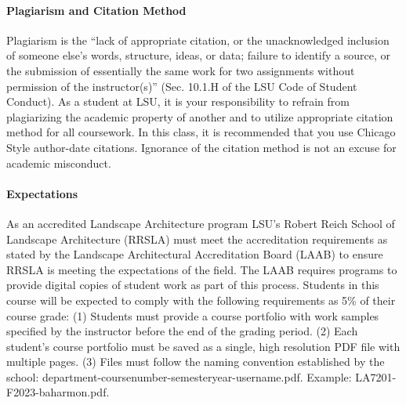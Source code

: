 \documentclass[11pt,article,oneside]{memoir}
\begin{document}
\paragraph{Plagiarism and Citation Method}
Plagiarism is the ``lack of appropriate citation, or the unacknowledged inclusion of someone else's words, structure, ideas, or data; failure to identify a source, or the submission of essentially the same work for two assignments without permission of the instructor(s)'' (Sec. 10.1.H of the LSU Code of Student Conduct). As a student at LSU, it is your responsibility to refrain from plagiarizing the academic property of another and to utilize appropriate citation method for all coursework. In this class, it is recommended that you use Chicago Style author-date citations. Ignorance of the citation method is not an excuse for academic misconduct.

\paragraph{Expectations}
As an accredited Landscape Architecture program
LSU's Robert Reich School of Landscape Architecture (RRSLA) 
must meet the accreditation requirements 
as stated by the Landscape Architectural Accreditation
Board (LAAB) to ensure RRSLA is meeting the expectations of the field. 
The LAAB requires programs to provide digital copies 
of student work as part of this process.
Students in this course will be expected 
to comply with the following requirements
as 5\% of their course grade: 
(1) Students must provide a course portfolio
with work samples specified by the instructor 
before the end of the grading period. 
(2) Each student's course portfolio must be saved as 
a single, high resolution PDF file with multiple pages. 
(3) Files must follow the naming convention
established by the school: department-coursenumber-semesteryear-username.pdf.
Example: LA7201-F2023-baharmon.pdf.
\end{document}
